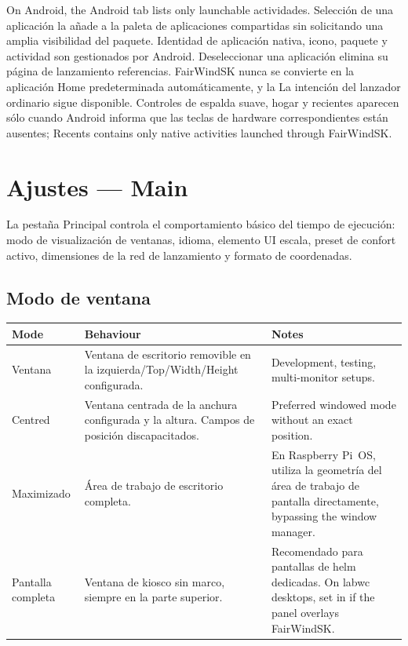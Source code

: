 On Android, the Android tab lists only launchable 
actividades. Selección de una aplicación la añade a la paleta de aplicaciones compartidas sin
solicitando una amplia visibilidad del paquete. Identidad de aplicación nativa, icono, paquete y
actividad son gestionados por Android. Deseleccionar una aplicación elimina su página de lanzamiento
referencias. FairWindSK nunca se convierte en la aplicación Home predeterminada automáticamente, y la
La intención del lanzador ordinario sigue disponible. Controles de espalda suave, hogar y recientes
aparecen sólo cuando Android informa que las teclas de hardware correspondientes están ausentes;
Recents contains only native activities launched through FairWindSK.

\chapter{Ajustes --- Main}
\label{ch:settings-main}

La pestaña Principal controla el comportamiento básico del tiempo de ejecución: modo de visualización de ventanas, idioma, elemento UI
escala, preset de confort activo, dimensiones de la red de lanzamiento y formato de coordenadas.


\section{Modo de ventana}

\begin{longtable}{L{2.4cm}L{5.6cm}L{5.7cm}}
\toprule
{}
\color{white}\sffamily\bfseries Mode &
\color{white}\sffamily\bfseries Behaviour &
\color{white}\sffamily\bfseries Notes \\
\midrule
Ventana&Ventana de escritorio removible en la izquierda/Top/Width/Height configurada.&
  Development, testing, multi-monitor setups. \\
Centred&Ventana centrada de la anchura configurada y la altura. Campos de posición discapacitados.&
  Preferred windowed mode without an exact position. \\
Maximizado&Área de trabajo de escritorio completa.&
En Raspberry Pi~OS, utiliza la geometría del área de trabajo de pantalla directamente,
  bypassing the window manager. \\
Pantalla completa&Ventana de kiosco sin marco, siempre en la parte superior.&
Recomendado para pantallas de helm dedicadas.
  On labwc desktops, set 
  in  if the panel overlays FairWindSK. \\
\bottomrule
\end{longtable}

